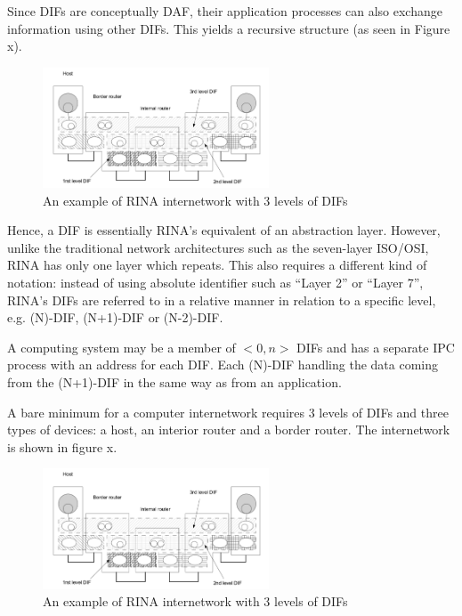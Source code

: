                 Since DIFs are conceptually DAF, their application processes can also exchange information using other DIFs. This yields a recursive structure (as seen in Figure x).

                \begin{figure}[H]
                    \begin{center}
                        \includegraphics[width=0.6\textwidth]{fig/archs_rina-net.png}
                      \caption{An example of RINA internetwork with 3 levels of DIFs}
                      \label{fig:rina_network}
                    \end{center}
                \end{figure}

                Hence, a DIF is essentially RINA's equivalent of an abstraction layer. However, unlike the traditional network architectures such as the seven-layer ISO/OSI, RINA has only one layer which repeats. This also requires a different kind of notation: instead of using absolute identifier such as ``Layer 2'' or ``Layer 7'', RINA's DIFs are referred to in a relative manner in relation to a specific level, e.g. (N)-DIF, (N+1)-DIF or (N-2)-DIF.

                A computing system may be a member of $<0,n>$ DIFs and has a separate IPC process with an address for each DIF. Each (N)-DIF handling the data coming from the (N+1)-DIF in the same way as from an application.

                A bare minimum for a computer internetwork requires 3 levels of DIFs and three types of devices: a host, an interior router and a border router. The internetwork is shown in figure x.

                \begin{figure}[H]
                    \begin{center}
                        \includegraphics[width=0.6\textwidth]{fig/archs_rina-net.png}
                      \caption{An example of RINA internetwork with 3 levels of DIFs}
                      \label{fig:rina_network}
                    \end{center}
                \end{figure}

